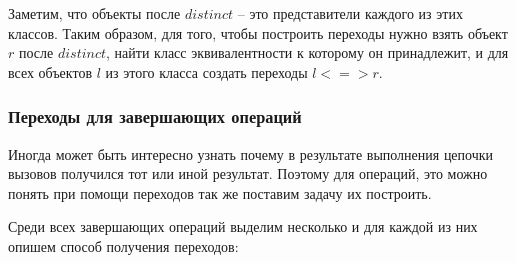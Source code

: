Заметим, что объекты после $distinct$ -- это представители каждого из этих классов. Таким образом, для того, чтобы построить переходы нужно взять объект $r$ после $distinct$, найти класс эквивалентности к которому он принадлежит, и для всех объектов $l$ из этого класса создать переходы $l <=> r$. 

\subsubsection{Переходы для завершающих операций}
Иногда может быть интересно узнать почему в результате выполнения цепочки вызовов получился тот или иной результат. Поэтому для операций, это можно понять при помощи переходов так же поставим задачу их построить.

Среди всех завершающих операций выделим несколько и для каждой из них опишем способ получения переходов:

